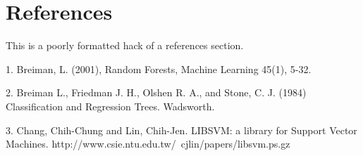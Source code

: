 \documentclass[letterpaper,twoside,10pt]{article}
\begin{document}
\section{References}\label{references}



This is a poorly formatted hack of a references section.

1. Breiman, L. (2001), Random Forests, Machine Learning 45(1), 5-32.

2. Breiman L., Friedman J. H., Olshen R. A., and Stone, C. J. (1984) Classification and Regression Trees. Wadsworth.

3. Chang, Chih-Chung and Lin, Chih-Jen. LIBSVM: a library for Support Vector Machines. http://www.csie.ntu.edu.tw/~cjlin/papers/libsvm.ps.gz
\end{document}
